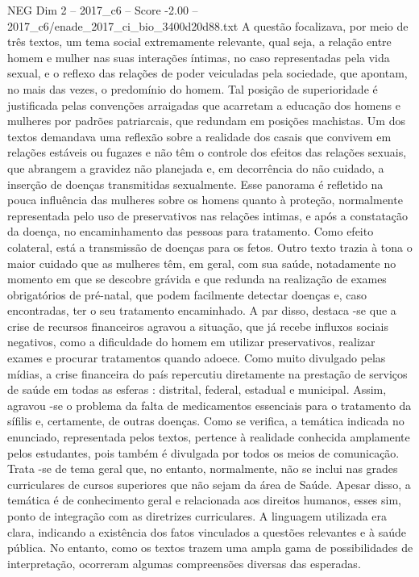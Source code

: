 \begin{textsample}{NEG Dim 2 – 2017\_c6 – Score -2.00 – 2017\_c6/enade\_2017\_ci\_bio\_3400d20d88.txt}
A questão focalizava, por meio de três textos, um tema social extremamente relevante, qual seja, a relação entre homem e mulher nas suas interações íntimas, no caso representadas pela vida sexual, e o reflexo das relações de poder veiculadas pela sociedade, que apontam, no mais das vezes, o predomínio do homem.
Tal posição de superioridade é justificada pelas convenções arraigadas que acarretam a educação dos homens e mulheres por padrões patriarcais, que redundam em posições machistas.
Um dos textos demandava uma reflexão sobre a realidade dos casais que convivem em relações estáveis ou fugazes e não têm o controle dos efeitos das relações sexuais, que abrangem a gravidez não planejada e, em decorrência do não cuidado, a inserção de doenças transmitidas sexualmente.
Esse panorama é refletido na pouca influência das mulheres sobre os homens quanto à proteção, normalmente representada pelo uso de preservativos nas relações intimas, e após a constatação da doença, no encaminhamento das pessoas para tratamento.
Como efeito colateral, está a transmissão de doenças para os fetos.
Outro texto trazia à tona o maior cuidado que as mulheres têm, em geral, com sua saúde, notadamente no momento em que se descobre grávida e que redunda na realização de exames obrigatórios de pré-natal, que podem facilmente detectar doenças e, caso encontradas, ter o seu tratamento encaminhado.
A par disso, destaca -se que a crise de recursos financeiros agravou a situação, que já recebe influxos sociais negativos, como a dificuldade do homem em utilizar preservativos, realizar exames e procurar tratamentos quando adoece.
Como muito divulgado pelas mídias, a crise financeira do país repercutiu diretamente na prestação de serviços de saúde em todas as esferas : distrital, federal, estadual e municipal.
Assim, agravou -se o problema da falta de medicamentos essenciais para o tratamento da sífilis e, certamente, de outras doenças.
Como se verifica, a temática indicada no enunciado, representada pelos textos, pertence à realidade conhecida amplamente pelos estudantes, pois também é divulgada por todos os meios de comunicação.
Trata -se de tema geral que, no entanto, normalmente, não se inclui nas grades curriculares de cursos superiores que não sejam da área de Saúde.
Apesar disso, a temática é de conhecimento geral e relacionada aos direitos humanos, esses sim, ponto de integração com as diretrizes curriculares.
A linguagem utilizada era clara, indicando a existência dos fatos vinculados a questões relevantes e à saúde pública.
No entanto, como os textos trazem uma ampla gama de possibilidades de interpretação, ocorreram algumas compreensões diversas das esperadas.

\end{textsample}
